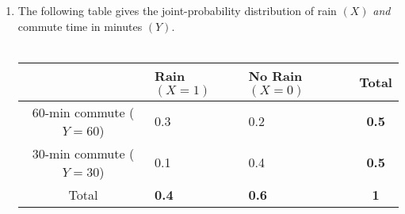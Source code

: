 \documentclass{./../../Latex/handout}
\begin{document}
\newpage
\begin{enumerate}
\item The following table gives the joint-probability distribution of rain $(X)$ \textit{and} commute time in minutes $(Y)$. \\~\\
\renewcommand{\arraystretch}{1.75}
\begin{tabularx}{0.95\textwidth}{cYYc}
\toprule
	& Rain $(X=1)$ & No Rain $(X=0)$ & Total \\
	-min commute ($Y=60$) & 0.3  & 0.2 & \textbf{0.5} \\ 
30-min commute ($Y=30$) & 0.1 & 0.4 & \textbf{0.5} \\
\midrule
 Total & \textbf{0.4} & \textbf{0.6 }& \textbf{1}\\
 \bottomrule
\end{tabularx} \\ 


\end{enumerate}
\end{document}
